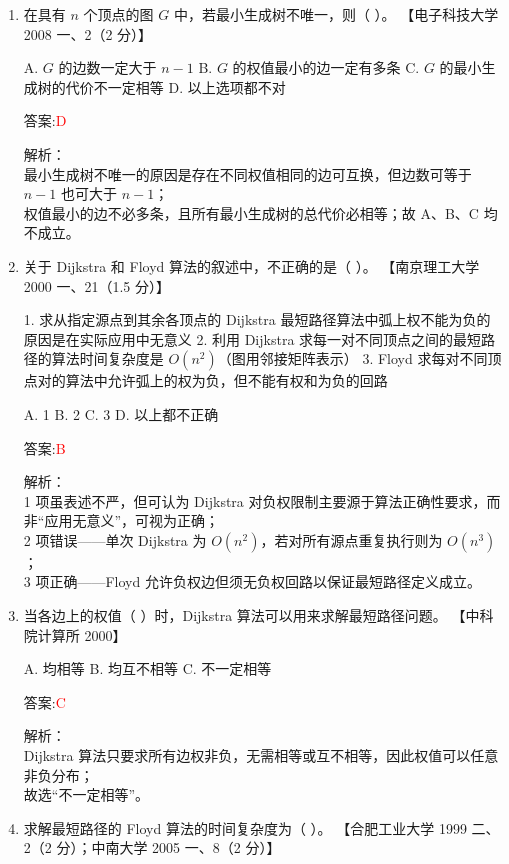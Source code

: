 \documentclass[lang=cn,newtx,10pt,scheme=chinese]{../../../elegantbook}
\begin{document}
\begin{enumerate}
\item 在具有 $n$ 个顶点的图 $G$ 中，若最小生成树不唯一，则（ ）。  
    【电子科技大学 2008 一、2（2 分）】

    A. $G$ 的边数一定大于 $n-1$  
    B. $G$ 的权值最小的边一定有多条  
    C. $G$ 的最小生成树的代价不一定相等  
    D. 以上选项都不对

    答案:\textcolor{red}{D}

    解析：\\
    最小生成树不唯一的原因是存在不同权值相同的边可互换，但边数可等于 $n-1$ 也可大于 $n-1$；\\
    权值最小的边不必多条，且所有最小生成树的总代价必相等；故 A、B、C 均不成立。\\

\item 关于 Dijkstra 和 Floyd 算法的叙述中，不正确的是（ ）。  
    【南京理工大学 2000 一、21（1.5 分）】

    1. 求从指定源点到其余各顶点的 Dijkstra 最短路径算法中弧上权不能为负的原因是在实际应用中无意义  
    2. 利用 Dijkstra 求每一对不同顶点之间的最短路径的算法时间复杂度是 $O(n^2)$（图用邻接矩阵表示）  
    3. Floyd 求每对不同顶点对的算法中允许弧上的权为负，但不能有权和为负的回路

    A. 1  
    B. 2  
    C. 3  
    D. 以上都不正确

    答案:\textcolor{red}{B}

    解析：\\
    1 项虽表述不严，但可认为 Dijkstra 对负权限制主要源于算法正确性要求，而非“应用无意义”，可视为正确；\\
    2 项错误——单次 Dijkstra 为 $O(n^2)$，若对所有源点重复执行则为 $O(n^3)$；\\
    3 项正确——Floyd 允许负权边但须无负权回路以保证最短路径定义成立。\\

\item 当各边上的权值（  ）时，Dijkstra 算法可以用来求解最短路径问题。  
    【中科院计算所 2000】

    A. 均相等  
    B. 均互不相等  
    C. 不一定相等

    答案:\textcolor{red}{C}

    解析：\\
    Dijkstra 算法只要求所有边权非负，无需相等或互不相等，因此权值可以任意非负分布；\\
    故选“不一定相等”。\\

\item 求解最短路径的 Floyd 算法的时间复杂度为（ ）。  
    【合肥工业大学 1999 二、2（2 分）；中南大学 2005 一、8（2 分）】


\end{enumerate}
\end{document}
